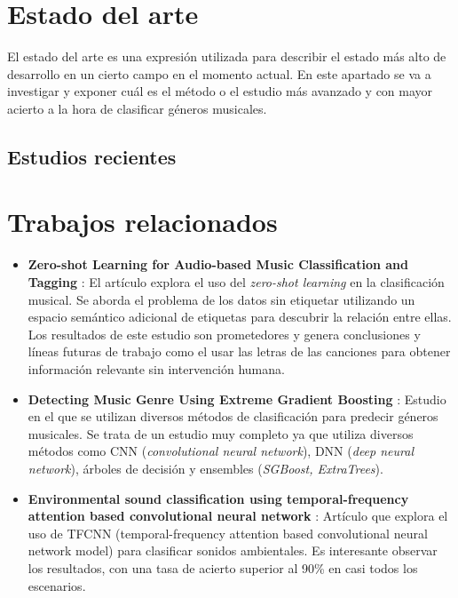 
\section{Estado del arte}

El estado del arte es una expresión utilizada para describir el estado más alto de desarrollo en un cierto campo en el momento actual. 
En este apartado se va a investigar y exponer cuál es el método o el estudio más avanzado y con mayor acierto a la hora de clasificar géneros musicales.

\subsection{Estudios recientes}



\section{Trabajos relacionados}

\begin{itemize}
\tightlist

\item \textbf{Zero-shot Learning for Audio-based Music Classification and Tagging} \cite{choi2020zeroshot}: El artículo explora el uso del \textit{zero-shot learning} en la clasificación musical. 
Se aborda el problema de los datos sin etiquetar utilizando un espacio semántico adicional de etiquetas para descubrir la relación entre ellas. 
Los resultados de este estudio son prometedores y genera conclusiones y líneas futuras de trabajo como el usar las letras de las canciones para obtener información relevante sin intervención humana.

\item \textbf{Detecting Music Genre Using Extreme Gradient Boosting} \cite{10.1145/3184558.3191822}: Estudio en el que se utilizan diversos métodos de clasificación para predecir géneros musicales. Se trata de un estudio muy completo ya
que utiliza diversos métodos como CNN (\textit{convolutional neural network}), DNN (\textit{deep neural network}), árboles de decisión y ensembles (\textit{SGBoost, ExtraTrees}).

\item \textbf{Environmental sound classification using temporal-frequency attention based convolutional neural network} \cite{Mu_Yin_Huang_Xu_Du_2021}: Artículo que explora el uso de TFCNN (temporal-frequency attention based convolutional neural network model)
para clasificar sonidos ambientales. Es interesante observar los resultados, con una tasa de acierto superior al 90\% en casi todos los escenarios.
\end{itemize}
